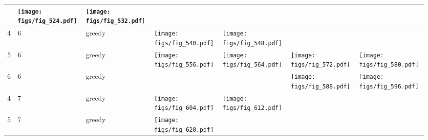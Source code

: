 \documentclass[oneside,canadian,landscape]{article}
\begin{document}
\begin{center}
\begin{longtable}{|l|l|l||l|l|l|l|}
\begin{minipage}{3.5cm}
\end{minipage}
&\begin{minipage}{3.5cm}
\texttt{[image: figs/fig\_524.pdf]}
\end{minipage}
&\begin{minipage}{3.5cm}
\texttt{[image: figs/fig\_532.pdf]}
\end{minipage}
\\ \hline
4&6&greedy&\begin{minipage}{3.5cm}
\texttt{[image: figs/fig\_540.pdf]}
\end{minipage}
&\begin{minipage}{3.5cm}
\texttt{[image: figs/fig\_548.pdf]}
\end{minipage}
&&\\ \hline
5&6&greedy&\begin{minipage}{3.5cm}
\texttt{[image: figs/fig\_556.pdf]}
\end{minipage}
&\begin{minipage}{3.5cm}
\texttt{[image: figs/fig\_564.pdf]}
\end{minipage}
&\begin{minipage}{3.5cm}
\texttt{[image: figs/fig\_572.pdf]}
\end{minipage}
&\begin{minipage}{3.5cm}
\texttt{[image: figs/fig\_580.pdf]}
\end{minipage}
\\ \hline
6&6&greedy&&&\begin{minipage}{3.5cm}
\texttt{[image: figs/fig\_588.pdf]}
\end{minipage}
&\begin{minipage}{3.5cm}
\texttt{[image: figs/fig\_596.pdf]}
\end{minipage}
\\ \hline
4&7&greedy&\begin{minipage}{3.5cm}
\texttt{[image: figs/fig\_604.pdf]}
\end{minipage}
&\begin{minipage}{3.5cm}
\texttt{[image: figs/fig\_612.pdf]}
\end{minipage}
&&\\ \hline
5&7&greedy&\begin{minipage}{3.5cm}
\texttt{[image: figs/fig\_620.pdf]}
\end{minipage}
&\begin{minipage}{3.5cm}

\end{minipage}
\end{longtable}
\end{center}
\end{document}
